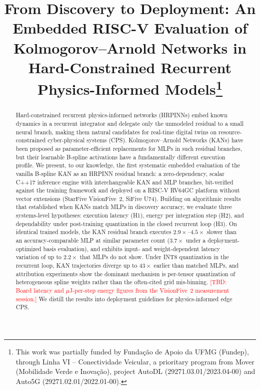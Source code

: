 \documentclass[conference]{IEEEtran}
\newcommand{\tbd}[1]{\textcolor{red}{[TBD: #1]}}
\begin{document}
\title{From Discovery to Deployment: An Embedded RISC-V Evaluation of
Kolmogorov--Arnold Networks in Hard-Constrained Recurrent
Physics-Informed Models\thanks{This work was partially funded by
Funda\c{c}\~ao de Apoio da UFMG (Fundep), through Linha VI -- Conectividade
Veicular, a prioritary program from Mover (Mobilidade Verde e
Inova\c{c}\~ao), project AutoDL (29271.03.01/2023.04-00) and Auto5G
(29271.02.01/2022.01-00).}}

\author{
}

\maketitle

\begin{abstract}
Hard-constrained recurrent physics-informed networks (HRPINNs) embed known
dynamics in a recurrent integrator and delegate only the unmodeled residual to
a small neural branch, making them natural candidates for real-time digital
twins on resource-constrained cyber-physical systems (CPS). Kolmogorov--Arnold
Networks (KANs) have been proposed as parameter-efficient replacements for
MLPs in such residual branches, but their learnable B-spline activations have
a fundamentally different execution profile. We present, to our knowledge, the
first systematic embedded evaluation of the vanilla B-spline KAN as an HRPINN
residual branch: a zero-dependency, scalar C++17 inference engine with
interchangeable KAN and MLP branches, bit-verified against the training
framework and deployed on a RISC-V RV64GC platform without vector extensions
(StarFive VisionFive~2, SiFive U74). Building on algorithmic results that
established when KANs match MLPs in discovery accuracy, we evaluate three
systems-level hypotheses: execution latency (H1), energy per integration step
(H2), and dependability under post-training quantization in the closed
recurrent loop (H3). On identical trained models, the KAN residual branch
executes $2.9\times$--$4.5\times$ slower than an accuracy-comparable MLP at
similar parameter count ($3.7\times$ under a deployment-optimized basis
evaluation), and exhibits input- and weight-dependent latency variation of up
to $2.2\times$ that MLPs do not show. Under INT8 quantization in the recurrent
loop, KAN trajectories diverge up to $43\times$ earlier than matched MLPs, and
attribution experiments show the dominant mechanism is per-tensor quantization
of heterogeneous spline weights rather than the often-cited grid
mis-binning. \tbd{Board latency and $\mu$J-per-step energy figures from the
VisionFive~2 measurement session.} We distill the results into deployment
guidelines for physics-informed edge CPS.
\end{abstract}
\end{document}
